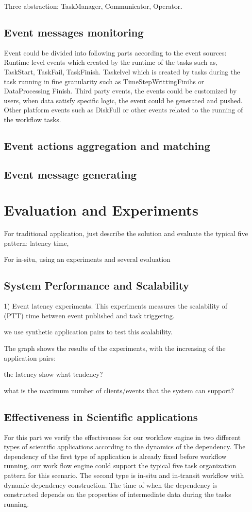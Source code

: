Three abstraction: TaskManager, Communicator, Operator.

\subsection{Event messages monitoring}
Event could be divided into following parts according to the event sources:
Runtime level events which created by the runtime of the tasks such as, TaskStart, TaskFail, TaskFinish.
Taskelvel which is created by tasks during the task running in fine granularity such as TimeStepWrittingFinihs or DataProcessing Finish.
Third party events, the events could be customized by users, when data satisfy specific logic, the event could be generated and pushed.
Other platform events such as DiskFull or other events related to the running of the workflow tasks.
\subsection{Event actions aggregation and matching}
\subsection{Event message generating}

\section{Evaluation and Experiments}
For traditional application, just describe the solution and evaluate the typical five pattern: latency time, 

For in-situ, using an experiments and several evaluation


\subsection{System Performance and Scalability}
1) Event latency experiments. This experiments measures the scalability of (PTT) time between event published and task triggering. 

we use synthetic application pairs to test this scalability.


The graph shows the results of the experiments, with the increasing of the application pairs:

the latency show what tendency?

what is the maximum number of clients/events that the system can support?

\subsection{Effectiveness in Scientific applications}
For this part we verify the effectiveness for our workflow engine in two different types of scientific applications according to the dynamics of the dependency. The dependency of the first type of application is already fixed before workflow running, our work flow engine could support the typical five task organization pattern \cite{todo} for this scenario. The second type is in-situ and in-transit workflow with dynamic dependency construction. The time of when the dependency is constructed depends on the properties of intermediate data during the tasks running.
